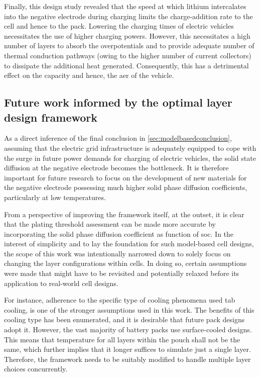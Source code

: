 Finally, this design study revealed that the speed at which lithium intercalates
into the negative  electrode during charging limits the  charge-addition rate to
the cell and hence to the pack. Lowering the charging times of electric vehicles
necessitates the  use of  higher charging powers.  However, this  necessitates a
high  number of  layers to  absorb the  overpotentials and  to provide  adequate
number of  thermal conduction pathways  (owing to  the higher number  of current
collectors) to dissipate the additional heat generated. Consequently, this has a
detrimental effect on the capacity and hence, the \gls{aer} of the vehicle.

\subsection{Future work informed by  the optimal layer design framework}

As     a     direct     inference     of     the     final     conclusion     in
\cref{sec:modelbasedconclusion}, assuming that  the electric grid infrastructure
is  adequately equipped  to cope  with  the surge  in future  power demands  for
charging  of  electric vehicles,  the  solid  state  diffusion at  the  negative
electrode becomes the bottleneck. It  is therefore important for future research
to  focus  on the  development  of  new  materials  for the  negative  electrode
possessing much higher  solid phase diffusion coefficients,  particularly at low
temperatures.

From a perspective of improving the framework itself, at the outset, it is clear
that the plating threshold assessment can be made more accurate by incorporating
the solid phase diffusion coefficient as  function of \gls{soc}. In the interest
of simplicity and  to lay the foundation for such  model-based cell designs, the
scope of this  work was intentionally narrowed down to  solely focus on changing
the layer  configurations within  cells. In doing  so, certain  assumptions were
made  that  might have  to  be  revisited  and  potentially relaxed  before  its
application to real-world cell designs.

For instance, adherence to the specific type of cooling phenomena used \ie{} tab
cooling, is one of  the stronger assumptions used in this  work. The benefits of
this cooling  type has  been enumerated,  and it is  desirable that  future pack
designs adopt it. However, the vast majority of battery packs use surface-cooled
designs. This means  that temperature for all layers within  the pouch shall not
be the same,  which further implies that  it longer suffices to  simulate just a
single layer. Therefore,  the framework needs to be suitably  modified to handle
multiple layer choices concurrently.

